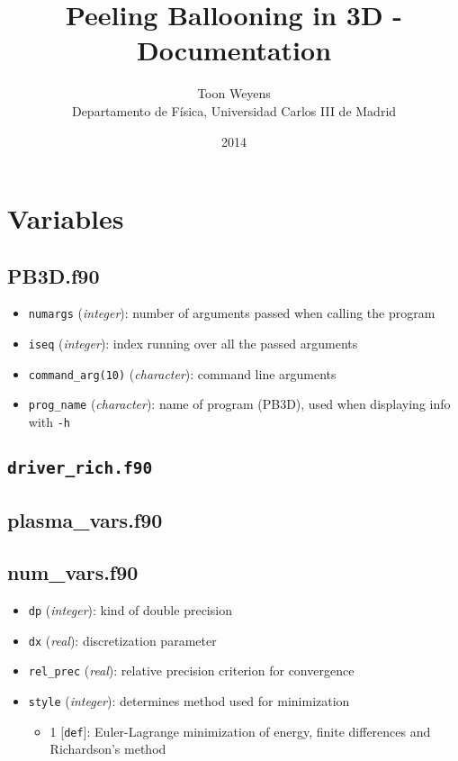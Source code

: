 \documentclass[pdftex,12pt,a4paper]{report}
\newcommand{\iv}{(\textit{integer})}
\newcommand{\rv}{(\textit{real})}
\newcommand{\cv}{(\textit{character})}
\begin{document}
\title{Peeling Ballooning in 3D - Documentation}
\date{2014}
\author{Toon Weyens\\ Departamento de F\'isica, Universidad Carlos III de Madrid}


\maketitle

\chapter{Variables}

\section{PB3D.f90}

\begin{itemize}
 \item \texttt{numargs} \iv: number of arguments passed when calling the program
 \item \texttt{iseq} \iv: index running over all the passed arguments
 \item \texttt{command\_arg(10)} \cv: command line arguments
 \item \texttt{prog\_name} \cv: name of program (PB3D), used when displaying info with \texttt{-h}
\end{itemize}

\section{\texttt{driver\_rich.f90}}

\section{plasma\_vars.f90}

\section{num\_vars.f90}

\begin{itemize}
 \item \texttt{dp} \iv: kind of double precision
 \item \texttt{dx} \rv: discretization parameter
 \item \texttt{rel\_prec} \rv: relative precision criterion for convergence
 \item \texttt{style} \iv: determines method used for minimization
  \begin{itemize}
   \item 1 [\texttt{def}]: Euler-Lagrange minimization of energy, finite differences and Richardson's method
  \end{itemize}

\end{itemize}
\end{document}

